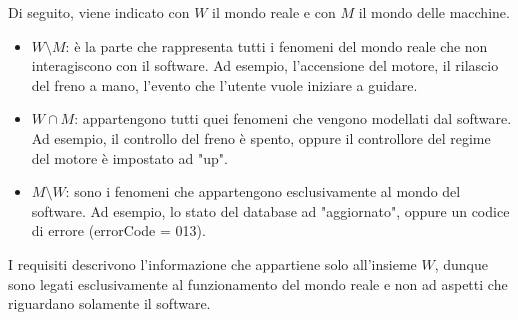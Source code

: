 \documentclass[italian]{article}
\begin{document}
	Di seguito, viene indicato con $W$ il mondo reale e con $M$ il mondo delle macchine.
	\begin{itemize}
		\item $W \setminus M$: è la parte che rappresenta tutti i fenomeni del mondo reale che non interagiscono con il software. Ad esempio, l'accensione del motore, il rilascio del freno a mano, l'evento che l'utente vuole iniziare a guidare.
		\item $W \cap M$: appartengono tutti quei fenomeni che vengono modellati dal software. Ad esempio, il controllo del freno è spento, oppure il controllore del regime del motore è impostato ad "up".
		\item $M \setminus W$: sono i fenomeni che appartengono esclusivamente al mondo del software. Ad esempio, lo stato del database ad "aggiornato", oppure un codice di errore (errorCode = 013).
	\end{itemize}
	I requisiti descrivono l'informazione che appartiene solo all'insieme $W$, dunque sono legati esclusivamente al funzionamento del mondo reale e non ad aspetti che riguardano solamente il software.
\end{document}
